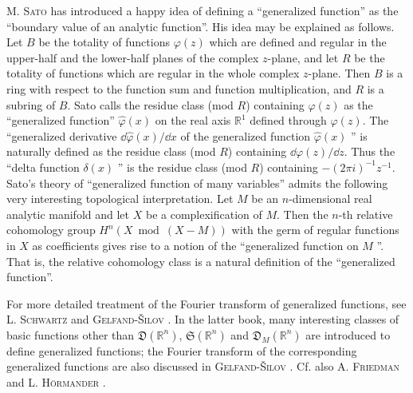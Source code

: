 \begin{remarkn}[Remark $2$] M. \textsc{Sato} \cite{sato284} has introduced a happy idea of defining a ``generalized function'' as the ``boundary value of an analytic function''. His idea may be explained as follows. Let $B$ be the totality of functions $\varphi(z)$ which are defined and regular in the upper-half and the lower-half planes of the complex $z$-plane, and let $R$ be the totality of functions which are regular in the whole complex $z$-plane. Then $B$ is a ring with respect to the function sum and function multiplication, and $R$ is a subring of $B$. Sato calls the residue class (mod $R$) containing $\varphi(z)$ as the ``generalized function'' $\hat{\varphi}(x)$ on the real axis $\mathbb{R}^{1}$ defined through $\varphi(z)$. The ``generalized derivative $\dd\hat{\varphi}(x)/\dd x$ of the generalized function $\hat{\varphi}(x)$ '' is naturally defined as the residue class (mod $R$) containing $\dd\varphi(z)/\dd z$. Thus the ``delta function $\delta(x)$ '' is the residue class (mod $R$) containing $-(2\pi i)^{-1}z^{-1}$. Sato's theory of ``generalized function of many variables'' admits the following very interesting topological interpretation. Let $M$ be an $n$-dimensional real analytic manifold and let $X$ be a complexification of $M$. Then the $n$-th relative cohomology group $H^{n}(X \bmod (X - M))$ with the germ of regular functions in $X$ as coefficients gives rise to a notion of the ``generalized function on $M$ ''. That is, the relative cohomology class is a natural definition of the ``generalized function''. 
\end{remarkn}

\begin{remarkn}[Remark $3$] For more detailed treatment of the Fourier transform of generalized functions, see L. \textsc{Schwartz} \cite{schwartz294} and \textsc{Gelfand}-\textsc{Šilov} \cite{gelfand76}. In the latter book, many interesting classes of basic functions other than $\mathfrak{D}(\mathbb{R}^{n})$, $\mathfrak{S}(\mathbb{R}^{n})$ and $\mathfrak{D}_M(\mathbb{R}^{n})$ are introduced to define generalized functions; the Fourier transform of the corresponding generalized functions are also discussed in \textsc{Gelfand}-\textsc{Šilov} \cite{gelfand76}. Cf. also A. \textsc{Friedman} \cite{friedman68} and L. \textsc{Hörmander} \cite{hormander118}. 
\end{remarkn}


\label{sec:VI.5}

